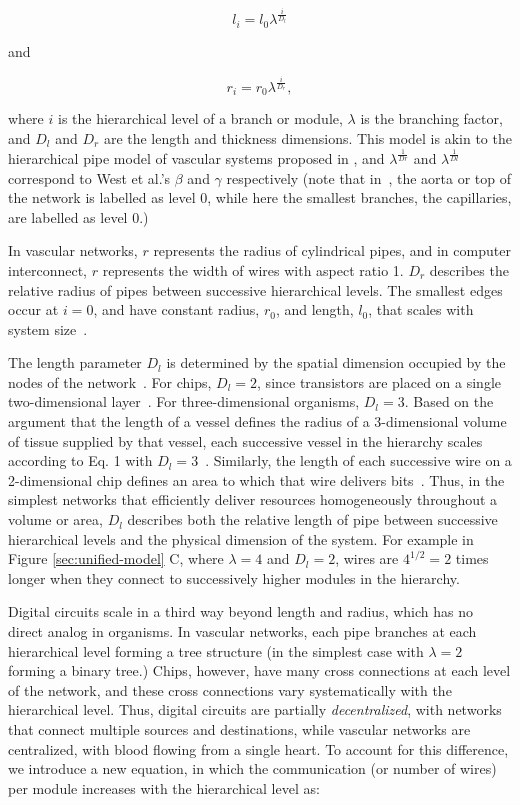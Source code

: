 \documentclass[12pt]{article}
\begin{document}
\begin{equation}
l_i = l_0 \lambda^{\frac{i}{D_l}}
\end{equation}

\noindent and

\begin{equation}
  r_i = r_0 \lambda^{\frac{i}{D_r}},
\label{eq:rscaling}
\end{equation}

\noindent where $i$ is the hierarchical level of a branch or module, $\lambda$
is the branching factor, and $D_l$ and $D_r$ are the length and thickness
dimensions. This model is akin to the hierarchical pipe model of vascular
systems proposed in \cite{west97}, and $\lambda^{\frac{1}{Dr}}$ and
$\lambda^{\frac{1}{Dl}}$ correspond to West et al.'s $\beta$ and $\gamma$
respectively (note that in~\cite{west97}, the aorta or top of the network is
labelled as level 0, while here the smallest branches, the capillaries, are
labelled as level 0.)

In vascular networks, $r$ represents the radius of cylindrical pipes, and in
computer interconnect, $r$ represents the width of wires with aspect ratio 1.
$D_r$ describes the relative radius of pipes between successive hierarchical
levels.  The smallest edges occur at $i = 0$, and have constant radius, $r_0$,
and length, $l_0$, that scales with system size~\cite{banavar10}. 

The length parameter $D_l$ is determined by the spatial dimension occupied by the
nodes of the network~\cite{mandelbrot83}.  For chips, $D_l = 2$, since
transistors are placed on a single two-dimensional layer~\cite{donath81}. For
three-dimensional organisms,  $D_l = 3$. Based on the argument that the length of a vessel defines the radius of a 3-dimensional volume of tissue supplied by that vessel, each successive vessel in the hierarchy scales according to Eq. 1 with $D_l = 3$~\cite{west97, banavar10}. Similarly, the length of each successive wire on a 2-dimensional chip defines an area to which that wire delivers bits~\cite{moses08}. Thus, in the simplest networks that efficiently deliver resources homogeneously throughout a volume or area, $D_l$ describes both the relative length of pipe between successive hierarchical levels and the physical
dimension of the system. For example in Figure \ref{sec:unified-model} C, where $\lambda = 4$ and $D_l = 2$, wires are $4^{1/2} = 2$ times longer when they connect to successively higher modules in the hierarchy.

Digital circuits scale in a third way beyond length and radius, which
has no direct analog in organisms.  In vascular networks, each pipe
branches at each hierarchical level forming a tree structure
(in the simplest case with $\lambda = 2$ forming
a binary tree.) Chips, however, have many cross connections at each
level of the network, and these cross connections
vary systematically with the hierarchical level.  Thus,
digital circuits are partially \emph{decentralized}, with networks
that connect
multiple sources and destinations, while vascular networks are
centralized, with blood flowing from a single heart. To account for
this difference, we introduce a new equation, in which the
communication (or number of wires) per module increases with the
hierarchical level as:  
\end{document}
